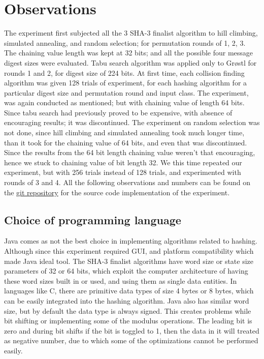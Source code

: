 \chapter{Observations}

The experiment first subjected all the 3 SHA-3 finalist algorithm to hill climbing, simulated annealing, and
random selection; for permutation rounds of 1, 2, 3. The chaining value length was kept at 32 bits; and all
the possible four message digest sizes were evaluated. Tabu search algorithm was applied only to Gr{\o}stl
for rounds 1 and 2, for digest size of 224 bits. At first time, each collision finding algorithm was given
128 trials of experiment, for each hashing algorithm for a particular digest size and permutation round and
input class. The experiment, was again conducted as mentioned; but with chaining value of length 64 bits. Since
tabu search had previously proved to be expensive, with absence of encouraging results; it was discontinued.
The experiment on random selection was not done, since hill climbing and simulated annealing took much longer
time, than it took for the chaining value of 64 bits, and even that was discontinued. Since the results from
the 64 bit length chaining value weren't that encouraging, hence we stuck to chaining value of bit length 32.
We this time repeated our experiment, but with 256 trials instead of 128 trials, and experimented with rounds
of 3 and 4. All the following observations and numbers can be found on the 
\href{https://github.com/sxs9174/MSProjectCode/tree/master/MSProjectCode/Output}{git repository} for the source
code implementation of the experiment.

\section{Choice of programming language}

Java comes as not the best choice in implementing algorithms related to hashing. Although since this experiment 
required GUI, and platform compatibility which made Java ideal tool. The SHA-3 finalist algorithms have word size
or state size parameters of 32 or 64 bits, which exploit the computer architecture of having these word sizes
built in or used, and using them as single data entities. In languages like C, there are primitive data types
of size 4 bytes or 8 bytes, which can be easily integrated into the hashing algorithm. Java also has similar
word size, but by default the data type is always signed. This creates problems while bit shifting or implementing
some of the modulus operations. The leading bit is zero and during bit shifts if the bit is toggled to 1, then 
the data in it will treated as negative number, due to which some of the optimizations cannot be performed easily.

